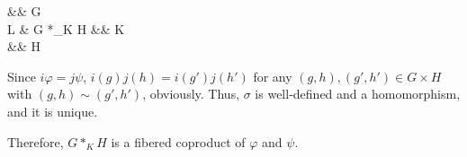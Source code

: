 {    \begin{cd}[row sep=1.2em, column sep=4em]
        \&\& G   \\
        L \& G *_K H  \&\& K  \ar[ld, "\psi"] \\
        \&\& H  \ar[lu, "\iota_H"]
    \end{cd}

    Since $i \varphi = j \psi$, $i(g)j(h) = i(g') j(h')$ for any $(g,h), (g',h') \in G \times H$ with $(g,h) \sim (g',h')$, obviously.
    Thus, $\sigma$ is well-defined and a homomorphism, and it is unique.

    Therefore, $G *_K H$ is a fibered coproduct of $\varphi$ and $\psi$.
}